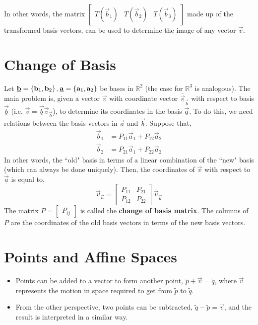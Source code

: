\documentclass[letterpaper,12pt]{article}
\begin{document}
In other words, the matrix $\begin{bmatrix} T(\vec{b}_1) & T(\vec{b}_2) & T(\vec{b}_3) \end{bmatrix}$ made up of the transformed basis vectors, can be used to determine the image of any vector $\vec{v}$. 

\section*{Change of Basis}
Let $\underline{\mathbf{b}} = \left\{ \mathbf{b}_1, \mathbf{b}_2 \right\}, \underline{\mathbf{a}} = \left\{ \mathbf{a}_1, \mathbf{a}_2 \right\}$ be bases in $\mathbb{R}^2$ (the case for $\mathbb{R}^3$ is analogous). The main problem is, given a vector $\vec{v}$ with coordinate vector $\overline{\vec{v}}_{\vec{b}}$ with respect to basis $\underline{\vec{b}}$ (i.e. $\vec{v} = \underline{\vec{b}} \overline{\vec{v}}_{\vec{b}}$), to determine its coordinates in the basis $\underline{\vec{a}}$. To do this, we need relations between the basis vectors in $\underline{\vec{a}}$ and $\underline{\vec{b}}$. Suppose that,
\begin{align*}
    \vec{b}_1 & = P_{11} \vec{a}_1 + P_{12} \vec{a}_2 \\
    \vec{b}_2 & = P_{21} \vec{a}_1 + P_{22} \vec{a}_2
\end{align*}
In other words, the ``old" basis in terms of a linear combination of the ``new" basis (which can always be done uniquely). Then, the coordinates of $\vec{v}$ with respect to $\underline{\vec{a}}$ is equal to,
\begin{equation*}
    \boxed{\overline{\vec{v}}_{\vec{a}} = \begin{bmatrix} P_{11} & P_{21} \\ P_{12} & P_{22} \end{bmatrix} \overline{\vec{v}}_{\vec{b}}}
\end{equation*}
The matrix $P = \begin{bmatrix} P_{ij} \end{bmatrix}$ is called the \textbf{change of basis matrix}. The columns of $P$ are the coordinates of the old basis vectors in terms of the new basis vectors.



\section*{Points and Affine Spaces}
\begin{itemize}
    \item Points can be added to a vector to form another point, $\tilde{p} + \vec{v} = \tilde{q}$, where $\vec{v}$ represents the motion in space required to get from $\tilde{p}$ to $\tilde{q}$.
    \item From the other perspective, two points can be subtracted, $\tilde{q} - \tilde{p} = \vec{v}$, and the result is interpreted in a similar way.
\end{itemize}
\end{document}
